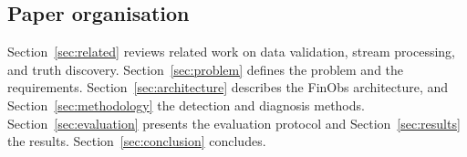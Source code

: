 \subsection{Paper organisation}

Section~\ref{sec:related} reviews related work on data validation, stream
processing, and truth discovery. Section~\ref{sec:problem} defines the problem and
the requirements. Section~\ref{sec:architecture} describes the FinObs architecture,
and Section~\ref{sec:methodology} the detection and diagnosis methods.
Section~\ref{sec:evaluation} presents the evaluation protocol and
Section~\ref{sec:results} the results. Section~\ref{sec:conclusion} concludes.
